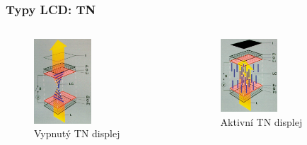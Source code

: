 \documentclass[aspectratio=169,11pt, allowframebreak=0.9]{beamer}
\begin{document}
\begin{frame}
    \frametitle{Typy LCD: TN}
    \begin{columns}
    \begin{figure}
        \centering
        \includegraphics[width=0.5\textwidth]{tnOFF}
        \caption{Vypnutý TN displej}
    \end{figure}
    \begin{figure}
        \centering
        \includegraphics[width=0.5\textwidth]{tnON}
        \caption{Aktivní TN displej}
    \end{figure}
    \end{columns}
    \end{frame}
\end{document}
